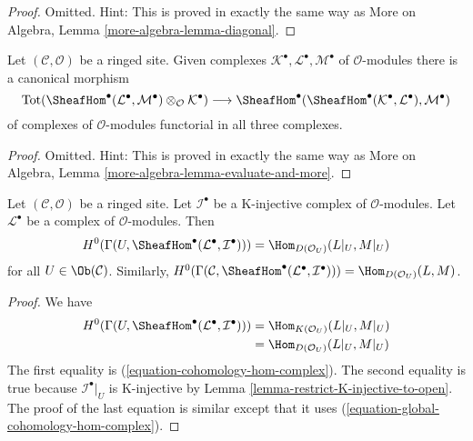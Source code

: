 \begin{proof}
Omitted. Hint: This is proved in exactly the same way as
More on Algebra, Lemma \ref{more-algebra-lemma-diagonal}.
\end{proof}

\begin{lemma}
\label{lemma-evaluate-and-more}
Let $(\mathcal{C}, \mathcal{O})$ be a ringed site. Given complexes
$\mathcal{K}^\bullet, \mathcal{L}^\bullet, \mathcal{M}^\bullet$
of $\mathcal{O}$-modules there is a canonical morphism
$$
\text{Tot}(\SheafHom^\bullet(\mathcal{L}^\bullet,
\mathcal{M}^\bullet) \otimes_\mathcal{O} \mathcal{K}^\bullet)
\longrightarrow
\SheafHom^\bullet(\SheafHom^\bullet(\mathcal{K}^\bullet,
\mathcal{L}^\bullet), \mathcal{M}^\bullet)
$$
of complexes of $\mathcal{O}$-modules functorial in all three complexes.
\end{lemma}

\begin{proof}
Omitted. Hint: This is proved in exactly the same way as
More on Algebra, Lemma \ref{more-algebra-lemma-evaluate-and-more}.
\end{proof}

\begin{lemma}
\label{lemma-RHom-into-K-injective}
Let $(\mathcal{C}, \mathcal{O})$ be a ringed site. Let $\mathcal{I}^\bullet$
be a K-injective complex of $\mathcal{O}$-modules. Let
$\mathcal{L}^\bullet$ be a complex of $\mathcal{O}$-modules.
Then
$$
H^0(\Gamma(U, \SheafHom^\bullet(\mathcal{L}^\bullet, \mathcal{I}^\bullet))) =
\Hom_{D(\mathcal{O}_U)}(L|_U, M|_U)
$$
for all $U \in \Ob(\mathcal{C})$. Similarly,
$H^0(\Gamma(\mathcal{C},
\SheafHom^\bullet(\mathcal{L}^\bullet, \mathcal{I}^\bullet))) =
\Hom_{D(\mathcal{O}_U)}(L, M)$.
\end{lemma}

\begin{proof}
We have
\begin{align*}
H^0(\Gamma(U, \SheafHom^\bullet(\mathcal{L}^\bullet, \mathcal{I}^\bullet)))
& =
\Hom_{K(\mathcal{O}_U)}(L|_U, M|_U) \\
& =
\Hom_{D(\mathcal{O}_U)}(L|_U, M|_U)
\end{align*}
The first equality is (\ref{equation-cohomology-hom-complex}).
The second equality is true because $\mathcal{I}^\bullet|_U$
is K-injective by Lemma \ref{lemma-restrict-K-injective-to-open}.
The proof of the last equation is similar except that it uses
(\ref{equation-global-cohomology-hom-complex}).
\end{proof}

